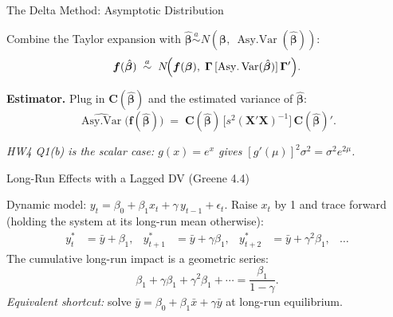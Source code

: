 \documentclass[aspectratio=169, handout, t]{beamer}
\numberwithin{equation}{section}
\begin{document}
\begin{frame}{The Delta Method: Asymptotic Distribution}

Combine the Taylor expansion with $\hat{\bm{\beta}} \overset{a}{\sim} N(\bm{\beta},\ \operatorname{Asy.Var}(\hat{\bm{\beta}}))$:
\[
\bm{f}(\hat{\bm{\beta}}) \;\overset{a}{\sim}\; N\!\Bigl(\bm{f}(\bm{\beta}),\; \bm{\Gamma}\,[\operatorname{Asy.Var}(\hat{\bm{\beta}})]\,\bm{\Gamma}'\Bigr).
\]

\pause

\medskip

\textbf{Estimator.} Plug in $\bm{C}(\hat{\bm{\beta}})$ and the estimated variance of $\hat{\bm{\beta}}$:
\[
\widehat{\operatorname{Asy.Var}}\bigl(\bm{f}(\hat{\bm{\beta}})\bigr) \;=\; \bm{C}(\hat{\bm{\beta}})\,\bigl[s^2(\bm{X}'\bm{X})^{-1}\bigr]\,\bm{C}(\hat{\bm{\beta}})'.
\]

\pause

\medskip

\textit{HW4 Q1(b) is the scalar case: $g(x) = e^x$ gives $[g'(\mu)]^2\sigma^2 = \sigma^2 e^{2\mu}$.}

\end{frame}


\begin{frame}{Long-Run Effects with a Lagged DV (Greene 4.4)}

Dynamic model: $y_t = \beta_0 + \beta_1 x_t + \gamma\, y_{t-1} + \epsilon_t$. Raise $x_t$ by 1 and trace forward (holding the system at its long-run mean otherwise):
\begin{align*}
y_t^* &= \bar y + \beta_1, &
y_{t+1}^* &= \bar y + \gamma\beta_1, &
y_{t+2}^* &= \bar y + \gamma^2\beta_1, &
\dots
\end{align*}
The cumulative long-run impact is a geometric series:
\[
\beta_1 + \gamma\beta_1 + \gamma^2\beta_1 + \cdots = \frac{\beta_1}{1-\gamma}.
\]
\textit{Equivalent shortcut:} solve $\bar y = \beta_0 + \beta_1 \bar x + \gamma \bar y$ at long-run equilibrium.

\end{frame}

\end{document}
